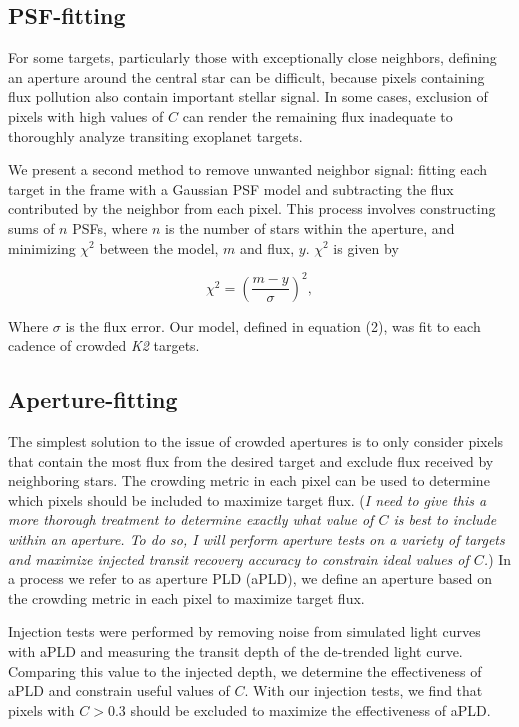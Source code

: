 \documentclass[12pt,preprint]{aastex}
\begin{document}
\subsection{PSF-fitting}

For some targets, particularly those with exceptionally close neighbors, defining an aperture around the central star can be difficult, because pixels containing flux pollution also contain important stellar signal. In some cases, exclusion of pixels with high values of $C$ can render the remaining flux inadequate to thoroughly analyze transiting exoplanet targets.

We present a second method to remove unwanted neighbor signal: fitting each target in the frame with a Gaussian PSF model and subtracting the flux contributed by the neighbor from each pixel. This process involves constructing sums of $n$ PSFs, where $n$ is the number of stars within the aperture, and minimizing $\chi^2$ between the model, $m$ and flux, $y$. $\chi^2$ is given by

\[
\tag{5}
\chi^2 = \left( \frac{m-y}{\sigma} \right)^2,
\]

Where $\sigma$ is the flux error. Our model, defined in equation (2), was fit to each cadence of crowded \textit{K2} targets.

\subsection{Aperture-fitting}

The simplest solution to the issue of crowded apertures is to only consider pixels that contain the most flux from the desired target and exclude flux received by neighboring stars. The crowding metric in each pixel can be used to determine which pixels should be included to maximize target flux. (\textit{I need to give this a more thorough treatment to determine exactly what value of $C$ is best to include within an aperture. To do so, I will perform aperture tests on a variety of targets and maximize injected transit recovery accuracy to constrain ideal values of $C$.}) In a process we refer to as aperture PLD (aPLD), we define an aperture based on the crowding metric in each pixel to maximize target flux.

Injection tests were performed by removing noise from simulated light curves with aPLD and measuring the transit depth of the de-trended light curve. Comparing this value to the injected depth, we determine the effectiveness of aPLD and constrain useful values of $C$. With our injection tests, we find that pixels with $C>0.3$ should be excluded to maximize the effectiveness of aPLD.
\end{document}
